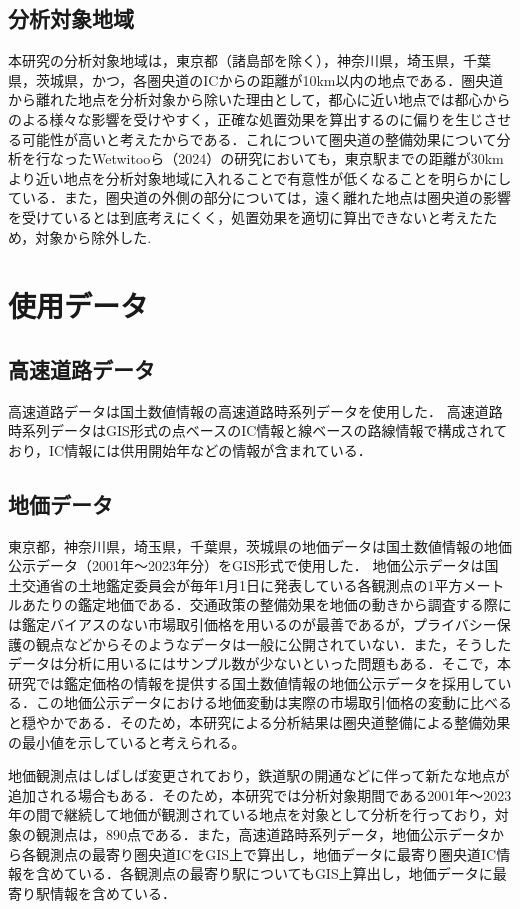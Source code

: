 \subsection{分析対象地域}
本研究の分析対象地域は，東京都（諸島部を除く），神奈川県，埼玉県，千葉県，茨城県，かつ，各圏央道のICからの距離が10km以内の地点である．圏央道から離れた地点を分析対象から除いた理由として，都心に近い地点では都心からのよる様々な影響を受けやすく，正確な処置効果を算出するのに偏りを生じさせる可能性が高いと考えたからである．これについて圏央道の整備効果について分析を行なったWetwitooら（2024）\cite{Weteitoo2024}の研究においても，東京駅までの距離が30kmより近い地点を分析対象地域に入れることで有意性が低くなることを明らかにしている．また，圏央道の外側の部分については，遠く離れた地点は圏央道の影響を受けているとは到底考えにくく，処置効果を適切に算出できないと考えたため，対象から除外した.

\section{使用データ}

\subsection{高速道路データ}
高速道路データは国土数値情報の高速道路時系列データを使用した．
高速道路時系列データはGIS形式の点ベースのIC情報と線ベースの路線情報で構成されており，IC情報には供用開始年などの情報が含まれている．

\subsection{地価データ}
東京都，神奈川県，埼玉県，千葉県，茨城県の地価データは国土数値情報の地価公示データ（2001年〜2023年分）をGIS形式で使用した．
地価公示データは国土交通省の土地鑑定委員会が毎年1月1日に発表している各観測点の1平方メートルあたりの鑑定地価である．交通政策の整備効果を地価の動きから調査する際には鑑定バイアスのない市場取引価格を用いるのが最善であるが，プライバシー保護の観点などからそのようなデータは一般に公開されていない．また，そうしたデータは分析に用いるにはサンプル数が少ないといった問題もある．そこで，本研究では鑑定価格の情報を提供する国土数値情報の地価公示データを採用している．\cite{shimizu2006}\cite{kunimi2021}この地価公示データにおける地価変動は実際の市場取引価格の変動に比べると穏やかである．そのため，本研究による分析結果は圏央道整備による整備効果の最小値を示していると考えられる。

地価観測点はしばしば変更されており，鉄道駅の開通などに伴って新たな地点が追加される場合もある．そのため，本研究では分析対象期間である2001年～2023年の間で継続して地価が観測されている地点を対象として分析を行っており，対象の観測点は，890点である．また，高速道路時系列データ，地価公示データから各観測点の最寄り圏央道ICをGIS上で算出し，地価データに最寄り圏央道IC情報を含めている．各観測点の最寄り駅についてもGIS上算出し，地価データに最寄り駅情報を含めている．

